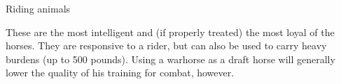 \begin{mmgroup}{Riding animals}
\begin{mmcomment}
 These are the most intelligent and (if properly treated)
the most loyal of the horses. They are responsive to a rider, but can
also be used to carry heavy burdens (up to 500 pounds). Using a
warhorse as a draft horse will generally lower the quality of his
training for combat, however.
\end{mmcomment}
\end{mmgroup}

